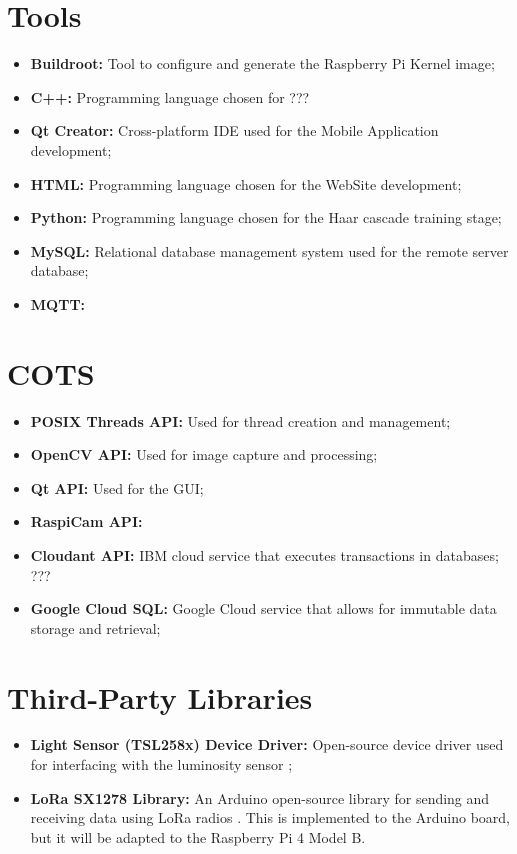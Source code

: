 \section{Tools}

\begin{itemize}
	\item \textbf{Buildroot:} Tool to configure and generate the Raspberry Pi Kernel image;
	\item \textbf{C++:} Programming language chosen for ???
	\item \textbf{Qt Creator:} Cross-platform IDE used for the Mobile Application development;
	\item \textbf{HTML:} Programming language chosen for the WebSite development;
	\item \textbf{Python:} Programming language chosen for the Haar cascade training stage;
	\item \textbf{MySQL:} Relational database management system used for the remote server database;
	\item \textbf{MQTT:}
\end{itemize}

\section{COTS}

\begin{itemize}
	\item \textbf{POSIX Threads API:} Used for thread creation and management;
	\item \textbf{OpenCV API:} Used for image capture and processing;
	\item \textbf{Qt API:} Used for the GUI;
	\item \textbf{RaspiCam API:} 
	\item \textbf{Cloudant API:} IBM cloud service that executes transactions in databases; ???
	\item \textbf{Google Cloud SQL:} Google Cloud service that allows for immutable data storage and retrieval;
\end{itemize}

\section{Third-Party Libraries}

\begin{itemize}
	\item \textbf{Light Sensor (TSL258x) Device Driver:} Open-source device driver used for interfacing with the luminosity sensor \cite{code_tsl};
	\item \textbf{LoRa SX1278 Library:} An Arduino open-source library for sending and receiving data using LoRa radios \cite{sx1278_lib}. This is implemented to the Arduino board, but it will be adapted to the Raspberry Pi 4 Model B.
\end{itemize}
